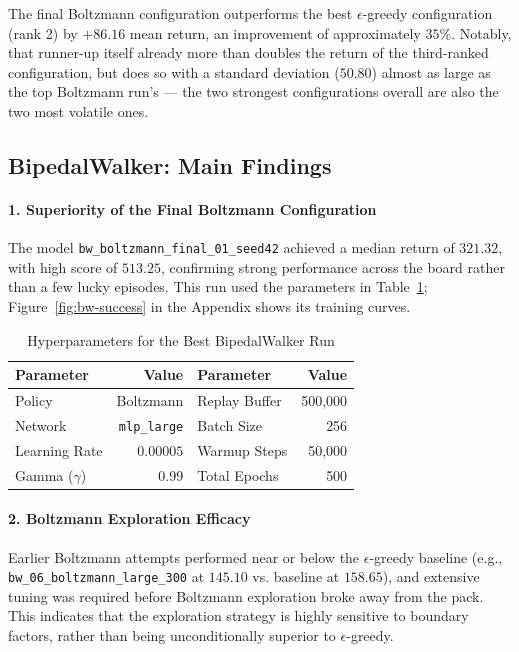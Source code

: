 The final Boltzmann configuration outperforms the best $\epsilon$-greedy configuration (rank 2) by $+86.16$ mean return, an improvement of approximately $35\%$. Notably, that runner-up itself already more than doubles the return of the third-ranked configuration, but does so with a standard deviation ($50.80$) almost as large as the top Boltzmann run's — the two strongest configurations overall are also the two most volatile ones.

\subsection{BipedalWalker: Main Findings}

\paragraph{1. Superiority of the Final Boltzmann Configuration}

The model \texttt{bw\_boltzmann\_final\_01\_seed42} achieved a median return of $321.32$, with high score of $513.25$, confirming strong performance across the board rather than a few lucky episodes. This run used the parameters in Table~\ref{tab:best_params}; Figure~\ref{fig:bw-success} in the Appendix shows its training curves.

\begin{table}[!ht]
    \centering
    \footnotesize
    \caption{Hyperparameters for the Best BipedalWalker Run}
    \label{tab:best_params}
    \begin{tabular}{lr | lr}
        \toprule
        Parameter & Value & Parameter & Value \\
        \midrule
        Policy & Boltzmann & Replay Buffer & 500,000 \\
        Network & \texttt{mlp\_large} & Batch Size & 256 \\
        Learning Rate & $0.00005$ & Warmup Steps & 50,000 \\
        Gamma ($\gamma$) & 0.99 & Total Epochs & 500 \\
        \bottomrule
    \end{tabular}
\end{table}

\paragraph{2. Boltzmann Exploration Efficacy}
Earlier Boltzmann attempts performed near or below the $\epsilon$-greedy baseline (e.g., \texttt{bw\_06\_boltzmann\_large\_300} at $145.10$ vs. baseline at $158.65$), and extensive tuning was required before Boltzmann exploration broke away from the pack. This indicates that the exploration strategy is highly sensitive to boundary factors, rather than being unconditionally superior to $\epsilon$-greedy.

